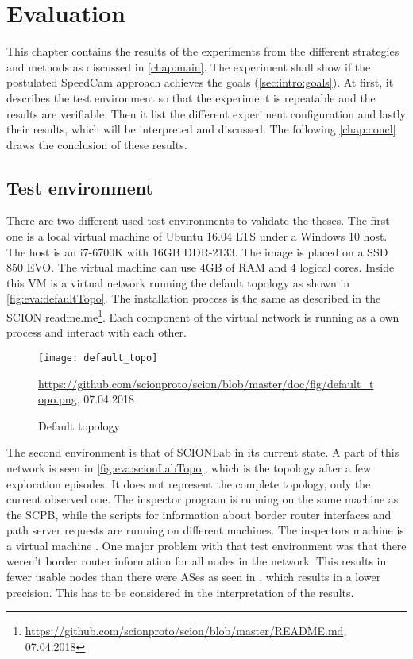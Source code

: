 \documentclass[thesis.tex]{subfiles}
\begin{document}
\chapter{Evaluation}\label{chap:eva}

This chapter contains the results of the experiments from the different strategies and methods as discussed in \autoref{chap:main}. The experiment shall show if the postulated SpeedCam approach achieves the goals (\autoref{sec:intro:goals}). At first, it describes the test environment so that the experiment is repeatable and the results are verifiable. Then it list the different experiment configuration and lastly their results, which will be interpreted and discussed. The following \autoref{chap:concl} draws the conclusion of these results.

\section{Test environment}

There are two different used test environments to validate the theses.
The first one is a local virtual machine of Ubuntu 16.04 LTS under a Windows 10 host. The host is an i7-6700K with 16GB DDR-2133. The image is placed on a SSD 850 EVO. The virtual machine can use 4GB of RAM and 4 logical cores. Inside this VM is a virtual network running the default topology as shown in \autoref{fig:eva:defaultTopo}. The installation process is the same as described in the SCION readme.me\footnote{\url{https://github.com/scionproto/scion/blob/master/README.md}, 07.04.2018}. Each component of the virtual network is running as a own process and interact with each other.

\begin{figure}
	\centering
	\texttt{[image: default\_topo]}
	\caption*{\tiny{\url{https://github.com/scionproto/scion/blob/master/doc/fig/default_topo.png}, 07.04.2018}}
	\caption{Default topology}
	\label{fig:eva:defaultTopo}
\end{figure}

The second environment is that of SCIONLab in its current state. A part of this network is seen in \autoref{fig:eva:scionLabTopo}, which is the topology after a few exploration episodes. It does not represent the complete topology, only the current observed one. The inspector program is running on the same machine as the SCPB, while the scripts for information about border router interfaces and path server requests are running on different machines. The inspectors machine is a virtual machine . One major problem with that test environment was that there weren't border router information for all nodes in the network. This results in fewer usable nodes than there were ASes as seen in , which results in a lower precision. This has to be considered in the interpretation of the results.
\end{document}
